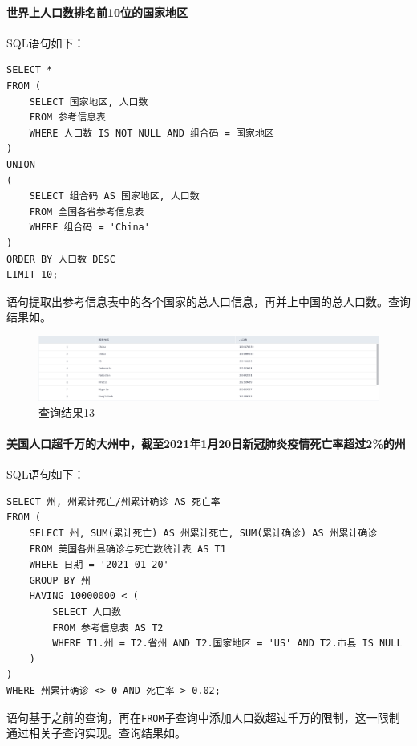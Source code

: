 \documentclass[lang=cn,11pt,a4paper,cite=authornum]{paper}
\begin{document}
\paragraph{世界上人口数排名前10位的国家地区} SQL语句如下：

\begin{code}
\begin{verbatim}
SELECT *
FROM (
    SELECT 国家地区, 人口数
    FROM 参考信息表
    WHERE 人口数 IS NOT NULL AND 组合码 = 国家地区
)
UNION 
(
    SELECT 组合码 AS 国家地区, 人口数
    FROM 全国各省参考信息表
    WHERE 组合码 = 'China'
)
ORDER BY 人口数 DESC 
LIMIT 10;
\end{verbatim}
\end{code}

语句提取出参考信息表中的各个国家的总人口信息，再并上中国的总人口数。查询结果如。

\begin{figure}[!htb]
    \centering
    \includegraphics[width=\textwidth]{./images/lab1_query13.png}
    \caption{查询结果13\label{fig:query13}}
\end{figure}

\paragraph{美国人口超千万的大州中，截至2021年1月20日新冠肺炎疫情死亡率超过2\%的州} SQL语句如下：

\begin{code}
\begin{verbatim}
SELECT 州, 州累计死亡/州累计确诊 AS 死亡率
FROM (
    SELECT 州, SUM(累计死亡) AS 州累计死亡, SUM(累计确诊) AS 州累计确诊
    FROM 美国各州县确诊与死亡数统计表 AS T1
    WHERE 日期 = '2021-01-20'
    GROUP BY 州
    HAVING 10000000 < (
        SELECT 人口数
        FROM 参考信息表 AS T2
        WHERE T1.州 = T2.省州 AND T2.国家地区 = 'US' AND T2.市县 IS NULL
    )
)
WHERE 州累计确诊 <> 0 AND 死亡率 > 0.02;
\end{verbatim}
\end{code}

语句基于之前的查询，再在\texttt{FROM}子查询中添加人口数超过千万的限制，这一限制通过相关子查询实现。查询结果如。
\end{document}
